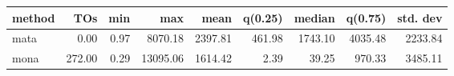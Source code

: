 \begin{tabular}{lrrrrrrrr}
\hline
 method   &    TOs &   min &      max &    mean &   q(0.25) &   median &   q(0.75) &   std. dev \\
\hline
 mata     &   0.00 &  0.97 &  8070.18 & 2397.81 &    461.98 &  1743.10 &   4035.48 &    2233.84 \\
 mona     & 272.00 &  0.29 & 13095.06 & 1614.42 &      2.39 &    39.25 &    970.33 &    3485.11 \\
\hline
\end{tabular}
